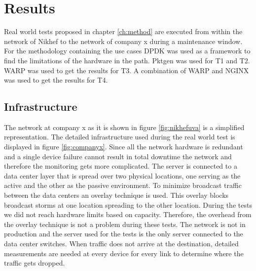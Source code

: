 \chapter{Results}\label{ch:results}
Real world tests proposed in chapter \ref{ch:method} are executed from within the network of Nikhef to the network of company x during a maintenance window.
For the methodology containing the use cases DPDK was used as a framework to find the limitations of the hardware in the path. 
Pktgen was used for T1 and T2. WARP was used to get the results for T3.
A combination of WARP and NGINX was used to get the results for T4. 


\section{Infrastructure}
The network at company x as it is shown in figure \ref{fig:nikhefuva} is a simplified representation.
The detailed infrastructure used during the real world test is displayed in figure \ref{fig:companyx}. 
Since all the network hardware is redundant and a single device failure cannot result in total downtime the network and therefore the monitoring gets more complicated.
The server is connected to a data center layer that is spread over two physical locations, one serving as the active and the other as the passive environment.
To minimize broadcast traffic between the data centers an overlay technique is used. This overlay blocks broadcast storms at one location spreading to the other location.
During the tests we did not reach hardware limits based on capacity. 
Therefore, the overhead from the overlay technique is not a problem during these tests.  
The network is not in production and the server used for the tests is the only server connected to the data center switches.     
When traffic does not arrive at the destination, detailed measurements are needed at every device for every link to determine where the traffic gets dropped.   

